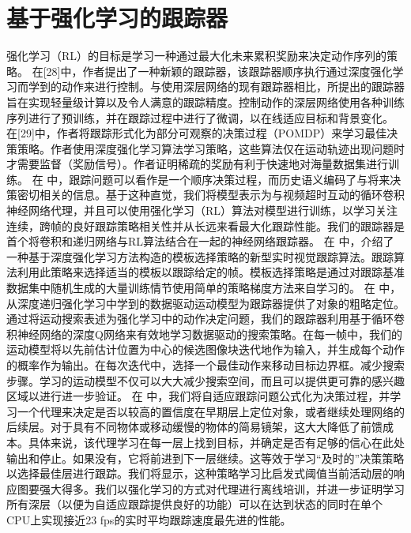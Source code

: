 \section{基于强化学习的跟踪器}
强化学习（RL）的目标是学习一种通过最大化未来累积奖励来决定动作序列的策略。
在[28]中，作者提出了一种新颖的跟踪器，该跟踪器顺序执行通过深度强化学习而学到的动作来进行控制。与使用深层网络的现有跟踪器相比，所提出的跟踪器旨在实现轻量级计算以及令人满意的跟踪精度。控制动作的深层网络使用各种训练序列进行了预训练，并在跟踪过程中进行了微调，以在线适应目标和背景变化。 %
在[29]中，作者将跟踪形式化为部分可观察的决策过程（POMDP）来学习最佳决策策略。作者使用深度强化学习算法学习策略，这些算法仅在运动轨迹出现问题时才需要监督（奖励信号）。作者证明稀疏的奖励有利于快速地对海量数据集进行训练。 %
在 \cite{DeepReinforcement} 中，跟踪问题可以看作是一个顺序决策过程，而历史语义编码了与将来决策密切相关的信息。基于这种直觉，我们将模型表示为与视频超时互动的循环卷积神经网络代理，并且可以使用强化学习（RL）算法对模型进行训练，以学习关注连续，跨帧的良好跟踪策略相关性并从长远来看最大化跟踪性能。我们的跟踪器是首个将卷积和递归网络与RL算法结合在一起的神经网络跟踪器。%
在 \cite{RealTimeVisual} 中，介绍了一种基于深度强化学习方法构造的模板选择策略的新型实时视觉跟踪算法。跟踪算法利用此策略来选择适当的模板以跟踪给定的帧。模板选择策略是通过对跟踪基准数据集中随机生成的大量训练情节使用简单的策略梯度方法来自学习的。%
在 \cite{HierarchicalTracking} 中，从深度递归强化学习中学到的数据驱动运动模型为跟踪器提供了对象的粗略定位。通过将运动搜索表述为强化学习中的动作决定问题，我们的跟踪器利用基于循环卷积神经网络的深度Q网络来有效地学习数据驱动的搜索策略。在每一帧中，我们的运动模型将以先前估计位置为中心的候选图像块迭代地作为输入，并生成每个动作的概率作为输出。在每次迭代中，选择一个最佳动作来移动目标边界框。减少搜索步骤。学习的运动模型不仅可以大大减少搜索空间，而且可以提供更可靠的感兴趣区域以进行进一步验证。%
在 \cite{LearningPolicies} 中，我们将自适应跟踪问题公式化为决策过程，并学习一个代理来决定是否以较高的置信度在早期层上定位对象，或者继续处理网络的后续层。对于具有不同物体或移动缓慢的物体的简易镜架，这大大降低了前馈成本。具体来说，该代理学习在每一层上找到目标，并确定是否有足够的信心在此处输出和停止。如果没有，它将前进到下一层继续。这等效于学习“及时的”决策策略以选择最佳层进行跟踪。我们将显示，这种策略学习比启发式阈值当前活动层的响应图要强大得多。我们以强化学习的方式对代理进行离线培训，并进一步证明学习所有深层（以便为自适应跟踪提供良好的功能）可以在达到状态的同时在单个CPU上实现接近23 fps的实时平均跟踪速度最先进的性能。%
